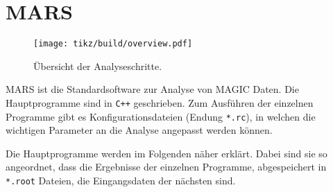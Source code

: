 \section{MARS}%
\label{sec:mars}

\begin{wrapfigure}[31]{r}{0.5\textwidth}
  \centering
  \texttt{[image: tikz/build/overview.pdf]}%
  \caption{Ü\-ber\-sicht der Ana\-lyse\-schrit\-te.}%
  \label{fig:uebersicht_analyse}
\end{wrapfigure}

MARS ist die Standardsoftware zur Analyse von MAGIC Daten.
Die Hauptprogramme sind in \texttt{C++} geschrieben.
Zum Ausführen der einzelnen Programme gibt es Konfigurationsdateien
(Endung \texttt{*.rc}),
in welchen die wichtigen Parameter an die Analyse angepasst werden können.


Die Hauptprogramme werden im Folgenden näher erklärt.
Dabei sind sie so angeordnet,
dass die Ergebnisse der einzelnen Programme,
abgespeichert in \texttt{*.root} Dateien,
die Eingangsdaten der nächsten sind.











